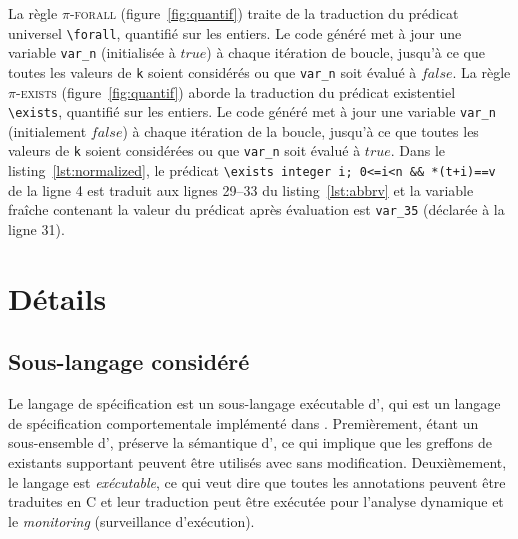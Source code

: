 La règle \textsc{$\pi$-forall} (figure~\ref{fig:quantif}) traite de la
traduction du prédicat universel \lstinline'\forall', quantifié sur les entiers.
Le code généré met à jour une variable \lstinline'var_n' (initialisée à $true$)
à chaque itération de boucle, jusqu'à ce que toutes les valeurs de \lstinline'k'
soient considérés ou que \lstinline'var_n' soit évalué à $false$.
La règle \textsc{$\pi$-exists} (figure~\ref{fig:quantif}) aborde la traduction
du prédicat existentiel \lstinline'\exists', quantifié sur les entiers.
Le code généré met à jour une variable \lstinline'var_n' (initialement $false$)
à chaque itération de la boucle, jusqu'à ce que toutes les valeurs de
\lstinline'k' soient considérées ou que \lstinline'var_n' soit évalué à $true$.
Dans le listing~\ref{lst:normalized}, le prédicat
\lstinline{\exists integer i; 0<=i<n && *(t+i)==v} de la ligne 4 est traduit
aux lignes 29--33 du listing~\ref{lst:abbrv} et la variable fraîche contenant la
valeur du prédicat après évaluation est \lstinline|var_35| (déclarée à la
ligne 31).



\section{Détails}
\label{sec:details}
\subsection{Sous-langage considéré}

Le langage de spécification \eacsl est un sous-langage exécutable d'\acsl, qui
est un langage de spécification comportementale implémenté dans \framac.
Premièrement, étant un sous-ensemble d'\acsl, \eacsl préserve la sémantique
d'\acsl, ce qui implique que les greffons de \framac existants supportant \acsl
peuvent être utilisés avec \eacsl sans modification.
Deuxièmement, le langage \eacsl est \textit{exécutable}, ce qui veut dire que
toutes les annotations peuvent être traduites en C et leur traduction peut être
exécutée pour l'analyse dynamique et le \textit{monitoring} (surveillance
d'exécution).


